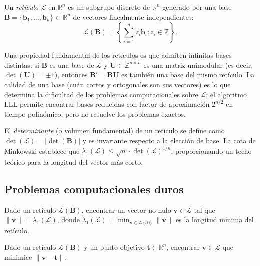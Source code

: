 \begin{definicion}[Retículo]
Un \emph{retículo} $\mathcal{L}$ en $\mathbb{R}^n$ es un subgrupo discreto de $\mathbb{R}^n$ generado por una base $\mathbf{B} = \{\mathbf{b}_1, \ldots, \mathbf{b}_n\} \subset \mathbb{R}^n$ de vectores linealmente independientes:
\begin{equation}
  \mathcal{L}(\mathbf{B}) = \left\{ \sum_{i=1}^{n} z_i \mathbf{b}_i : z_i \in \mathbb{Z} \right\}.
  \label{eq:lattice}
\end{equation}
\end{definicion}

Una propiedad fundamental de los retículos es que admiten infinitas bases distintas: si $\mathbf{B}$ es una base de $\mathcal{L}$ y $\mathbf{U} \in \mathbb{Z}^{n \times n}$ es una matriz unimodular (es decir, $\det(\mathbf{U}) = \pm 1$), entonces $\mathbf{B}' = \mathbf{B}\mathbf{U}$ es también una base del mismo retículo. La calidad de una base (cuán cortos y ortogonales son sus vectores) es lo que determina la dificultad de los problemas computacionales sobre $\mathcal{L}$; el algoritmo LLL \parencite{lenstra1982lll} permite encontrar bases reducidas con factor de aproximación $2^{n/2}$ en tiempo polinómico, pero no resuelve los problemas exactos.

El \emph{determinante} (o volumen fundamental) de un retículo se define como $\det(\mathcal{L}) = |\det(\mathbf{B})|$ y es invariante respecto a la elección de base. La cota de Minkowski establece que $\lambda_1(\mathcal{L}) \leq \sqrt{n} \cdot \det(\mathcal{L})^{1/n}$, proporcionando un techo teórico para la longitud del vector más corto.

\subsection{Problemas computacionales duros}

\begin{definicion}
Dado un retículo $\mathcal{L}(\mathbf{B})$, encontrar un vector no nulo $\mathbf{v} \in \mathcal{L}$ tal que $\|\mathbf{v}\| = \lambda_1(\mathcal{L})$, donde $\lambda_1(\mathcal{L}) = \min_{\mathbf{v} \in \mathcal{L} \setminus \{0\}} \|\mathbf{v}\|$ es la longitud mínima del retículo.
\end{definicion}

\begin{definicion}
Dado un retículo $\mathcal{L}(\mathbf{B})$ y un punto objetivo $\mathbf{t} \in \mathbb{R}^n$, encontrar $\mathbf{v} \in \mathcal{L}$ que minimice $\|\mathbf{v} - \mathbf{t}\|$.
\end{definicion}

